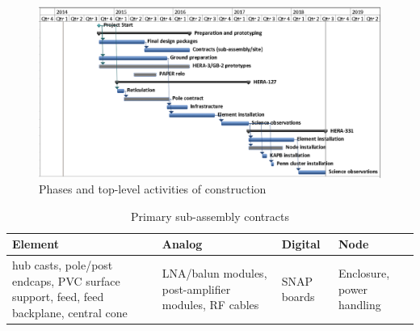 \documentclass[preprint]{aastex}
\begin{document}
\begin{figure}[htb]
\centering
\includegraphics[width=\textwidth]{plots/phases.png}
\caption{Phases and top-level activities of construction}
\label{fig:phasesSummary}
\end{figure}

\begin{table}[tbh]
\centering
\label{tab:subassycontracts}
\caption{Primary sub-assembly contracts}
\begin{tabular}{| p{1.4in} | p{1.4in} | p{1.4in} | p{1.4in} |}\hline
\textbf{Element} & \textbf{Analog} & \textbf{Digital} & \textbf{Node} \\ \hline
hub casts, pole/post endcaps, PVC surface support, feed, feed backplane, central cone &
LNA/balun modules, post-amplifier modules, RF cables &
SNAP boards &
Enclosure, power handling \\ \hline
\end{tabular}
\end{table}
\end{document}
